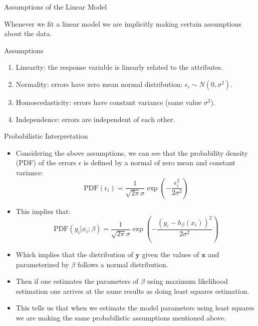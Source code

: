 \documentclass[handout]{beamer}
\begin{document}
\begin{frame}{Assumptions of the Linear Model}
\scriptsize{





Whenever we fit a linear model we are implicitly making certain assumptions about the data.  


\begin{block}{Assumptions}
\begin{enumerate}
\item Linearity: the response variable is linearly related to the attributes. 
\item  Normality: errors have zero mean normal distribution: $\epsilon_{i} \sim N(0,\sigma^2)$.
\item Homoscedasticity: errors have constant variance (same value $\sigma^2$).
\item Independence: errors are independent of each other.
 
\end{enumerate}
 
\end{block}

} 
\end{frame}


\begin{frame}{Probabilistic Interpretation}
\scriptsize{
\begin{itemize}
 \item Considering the above assumptions, we can see that the probability density (PDF) of the errors $\epsilon$ is defined by a normal of zero mean and constant variance:
 \begin{displaymath}
  \text{PDF}(\epsilon_{i})=\frac{1}{\sqrt{2\pi} \sigma} \exp \left(- \frac{\epsilon_{i}^{2}}{2\sigma^2}\right)
 \end{displaymath}
 \item This implies that:
  \begin{displaymath}
  \text{PDF}(y_i|x_{i};\beta)=\frac{1}{\sqrt{2\pi} \sigma} \exp \left(- \frac{(y_i - h_{\beta}(x_{i}) )^{2}}{2\sigma^2}\right)
 \end{displaymath}
\item Which implies that the distribution of $\mathbf{y}$ given the values of $\mathbf{x}$ and parameterized by $\beta$ follows a normal distribution.
 \item Then if one estimates the parameters of $\beta$ using maximum likelihood estimation one arrives at the same results as doing least squares estimation.
 \item This tells us that when we estimate the model parameters using least squares we are making the same probabilistic assumptions mentioned above.

\end{itemize}


}
 
\end{frame}
\end{document}
